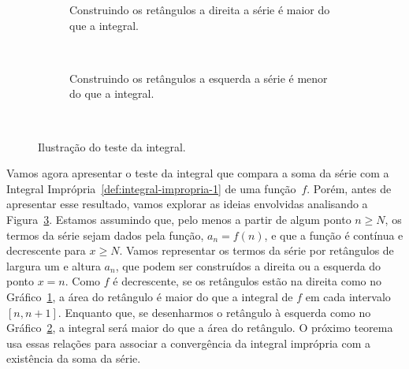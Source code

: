\begin{figure}
  \centering
  \begin{subfigure}{\linewidth}
    \centering
    \vspace{2mm}
    
    \caption{Construindo os retângulos a direita a série é maior do que a integral.}
    \label{fig:teste_integral_right}
  \end{subfigure}\\[2mm]
  \begin{subfigure}{\linewidth}
    \centering
    
    \caption{Construindo os retângulos a esquerda a série é menor do que a integral.}
    \label{fig:teste_integral_left}
  \end{subfigure}\\
  \caption{Ilustração do teste da integral.}
  \label{fig:teste_integral}
\end{figure}

Vamos agora apresentar o teste da integral que compara a soma da série com a Integral
Imprópria~\ref{def:integral-impropria-1} de uma função~$f$.
Porém, antes de apresentar esse resultado, vamos explorar as ideias envolvidas
analisando a Figura~\ref{fig:teste_integral}.
Estamos assumindo que, pelo menos a partir de algum ponto $n\geq N$,
os termos da série sejam dados pela função, $a_n=f(n)$,
e que a função é contínua e decrescente para  $x\geq N$.
Vamos representar os termos da série por retângulos de largura um e altura $a_n$,
que podem ser construídos a direita ou a esquerda do ponto $x=n$.
Como $f$ é decrescente, se os retângulos estão na direita
como no Gráfico~\ref{fig:teste_integral_right},
a área do retângulo é maior do que a integral de $f$ em cada intervalo $[n, n+1]$.
Enquanto que, se desenharmos o retângulo à esquerda
como no Gráfico~\ref{fig:teste_integral_left},
a integral será maior do que a área do retângulo.
O próximo teorema usa essas relações para associar a convergência da integral
imprópria com a existência da soma da série.


